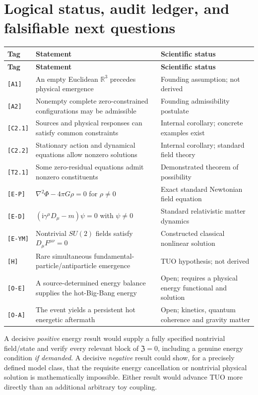 \documentclass[11pt,a4paper]{article}
\newcommand{\R}{\mathbb{R}}
\newcommand{\ii}{\mathrm{i}}
\newcommand{\cZ}{\mathfrak Z}
\theoremstyle{tmon}
\theoremstyle{definition}
\begin{document}
\section{Logical status, audit ledger, and falsifiable next questions}
\small
\begin{longtable}{@{}p{.10\linewidth}p{.49\linewidth}p{.33\linewidth}@{}}
\toprule
\textbf{Tag} & \textbf{Statement} & \textbf{Scientific status}\\\midrule
\endfirsthead
\toprule\textbf{Tag}&\textbf{Statement}&\textbf{Scientific status}\\\midrule\endhead
\texttt{[A1]} & An empty Euclidean $\R^3$ precedes physical emergence & Founding assumption; not derived\\
\texttt{[A2]} & Nonempty complete zero-constrained configurations may be admissible & Founding admissibility postulate\\
\texttt{[C2.1]} & Sources and physical responses can satisfy common constraints & Internal corollary; concrete examples exist\\
\texttt{[C2.2]} & Stationary action and dynamical equations allow nonzero solutions & Internal corollary; standard field theory\\
\texttt{[T2.1]} & Some zero-residual equations admit nonzero constituents & Demonstrated theorem of possibility\\
\texttt{[E-P]} & $\nabla^2\Phi-4\pi G\rho=0$ for $\rho\ne0$ & Exact standard Newtonian field equation\\
\texttt{[E-D]} & $(\ii\gamma^\mu D_\mu-m)\psi=0$ with $\psi\ne0$ & Standard relativistic matter dynamics\\
\texttt{[E-YM]} & Nontrivial $SU(2)$ fields satisfy $D_\mu F^{\mu\nu}=0$ & Constructed classical nonlinear solution\\
\texttt{[H]} & Rare simultaneous fundamental-particle/antiparticle emergence & TUO hypothesis; not derived\\
\texttt{[O-E]} & A source-determined energy balance supplies the hot-Big-Bang energy & Open; requires a physical energy functional and solution\\
\texttt{[O-A]} & The event yields a persistent hot energetic aftermath & Open; kinetics, quantum coherence and gravity matter\\
\bottomrule
\end{longtable}
\normalsize

A decisive \emph{positive} energy result would supply a fully specified nontrivial field/state and verify every relevant block of $\cZ=0$, including a genuine energy condition \emph{if demanded}. A decisive \emph{negative} result could show, for a precisely defined model class, that the requisite energy cancellation or nontrivial physical solution is mathematically impossible. Either result would advance TUO more directly than an additional arbitrary toy coupling.
\end{document}
